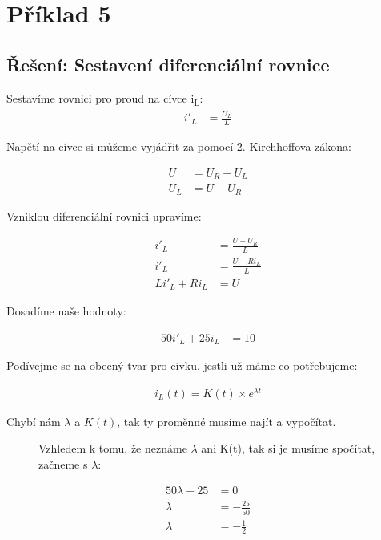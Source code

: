 \section{Příklad 5}

\subsection{Řešení: Sestavení diferenciální rovnice}

Sestavíme rovnici pro proud na cívce i\textsubscript{L}:
\begin{align*}
	i'_L &= \frac{U_L}{L}
\end{align*}

Napětí na cívce si můžeme vyjádřit za pomocí 2. Kirchhoffova zákona:

\begin{align*}
	U &= U_R + U_L\\
	U_L &= U-U_R
\end{align*}

Vzniklou diferenciální rovnici upravíme:

\begin{align*}
	i'_L &= \frac{U-U_R}{L} \\
	i'_L &= \frac{U-Ri_L}{L} \\
	Li'_L + Ri_L &= U
\end{align*}

Dosadíme naše hodnoty:

\begin{align*}
	50i'_L + 25i_L &= 10
\end{align*}

Podívejme se na obecný tvar pro cívku, jestli už máme co potřebujeme:

\begin{align*}
	i_L(t)=K(t)\times e^{\lambda t}
\end{align*}

Chybí nám $\lambda$ a $K(t)$, tak ty proměnné musíme najít a vypočítat.

\begin{figure}[H]
Vzhledem k tomu, že neznáme $\lambda$ ani K(t), tak si je musíme spočítat, začneme s $\lambda$:

\begin{align*}
	50\lambda + 25 &= 0 \\
	\lambda &= - \frac{25}{50} \\
	\lambda &= -\frac{1}{2}
\end{align*}
\end{figure}

